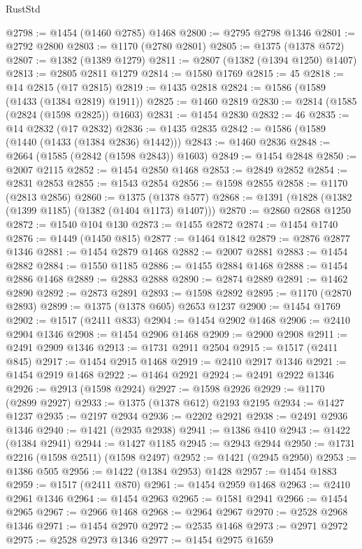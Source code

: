 \begin{lexlean}{RustStd}
\begin{coremodule}
@2798 := @1454 (@1460 @2785) @1468
@2800 := @2795 @2798 @1346
@2801 := @2792 @2800
@2803 := @1170 (@2780 @2801)
@2805 := @1375 (@1378 @572)
@2807 := @1382 (@1389 @1279)
@2811 := @2807 (@1382 (@1394 @1250) @1407)
@2813 := @2805 @2811 @1279
@2814 := @1580 @1769
@2815 := 45
@2818 := @14 @2815 (@17 @2815)
@2819 := @1435 @2818
@2824 := @1586 (@1589 (@1433 (@1384 @2819) @1911))
@2825 := @1460 @2819
@2830 := @2814 (@1585 (@2824 (@1598 @2825)) @1603)
@2831 := @1454 @2830
@2832 := 46
@2835 := @14 @2832 (@17 @2832)
@2836 := @1435 @2835
@2842 := @1586 (@1589 (@1440 (@1433 (@1384 @2836) @1442)))
@2843 := @1460 @2836
@2848 := @2664 (@1585 (@2842 (@1598 @2843)) @1603)
@2849 := @1454 @2848
@2850 := @2007 @2115
@2852 := @1454 @2850 @1468
@2853 := @2849 @2852
@2854 := @2831 @2853
@2855 := @1543 @2854
@2856 := @1598 @2855
@2858 := @1170 (@2813 @2856)
@2860 := @1375 (@1378 @577)
@2868 := @1391 (@1828 (@1382 (@1399 @1185) (@1382 (@1404 @1173) @1407)))
@2870 := @2860 @2868 @1250
@2872 := @1540 @104 @130
@2873 := @1455 @2872
@2874 := @1454 @1740
@2876 := @1449 (@1450 @815)
@2877 := @1464 @1842
@2879 := @2876 @2877 @1346
@2881 := @1454 @2879 @1468
@2882 := @2007 @2881
@2883 := @1454 @2882
@2884 := @1550 @1185
@2886 := @1455 @2884 @1468
@2888 := @1454 @2886 @1468
@2889 := @2883 @2888
@2890 := @2874 @2889
@2891 := @1462 @2890
@2892 := @2873 @2891
@2893 := @1598 @2892
@2895 := @1170 (@2870 @2893)
@2899 := @1375 (@1378 @605) @2653 @1237
@2900 := @1454 @1769
@2902 := @1517 (@2411 @833)
@2904 := @1454 @2902 @1468
@2906 := @2410 @2904 @1346
@2908 := @1454 @2906 @1468
@2909 := @2900 @2908
@2911 := @2491 @2909 @1346
@2913 := @1731 @2911 @2504
@2915 := @1517 (@2411 @845)
@2917 := @1454 @2915 @1468
@2919 := @2410 @2917 @1346
@2921 := @1454 @2919 @1468
@2922 := @1464 @2921
@2924 := @2491 @2922 @1346
@2926 := @2913 (@1598 @2924)
@2927 := @1598 @2926
@2929 := @1170 (@2899 @2927)
@2933 := @1375 (@1378 @612) @2193 @2195
@2934 := @1427 @1237
@2935 := @2197 @2934
@2936 := @2202 @2921
@2938 := @2491 @2936 @1346
@2940 := @1421 (@2935 @2938)
@2941 := @1386 @410
@2943 := @1422 (@1384 @2941)
@2944 := @1427 @1185
@2945 := @2943 @2944
@2950 := @1731 @2216 (@1598 @2511) (@1598 @2497)
@2952 := @1421 (@2945 @2950)
@2953 := @1386 @505
@2956 := @1422 (@1384 @2953) @1428
@2957 := @1454 @1883
@2959 := @1517 (@2411 @870)
@2961 := @1454 @2959 @1468
@2963 := @2410 @2961 @1346
@2964 := @1454 @2963
@2965 := @1581 @2941
@2966 := @1454 @2965
@2967 := @2966 @1468
@2968 := @2964 @2967
@2970 := @2528 @2968 @1346
@2971 := @1454 @2970
@2972 := @2535 @1468
@2973 := @2971 @2972
@2975 := @2528 @2973 @1346
@2977 := @1454 @2975 @1659

\end{coremodule}
\end{lexlean}
